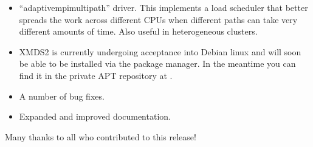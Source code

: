 \documentclass[letterpaper,10pt,english]{sphinxmanual}
\begin{document}
\begin{itemize}
\item {} 
\sphinxAtStartPar
“adaptive\sphinxhyphen{}mpi\sphinxhyphen{}multipath” driver.  This implements a load scheduler that better spreads the work across different CPUs when different paths can take very different amounts of time. Also useful in heterogeneous clusters.

\item {} 
\sphinxAtStartPar
XMDS2 is currently undergoing acceptance into Debian linux and will soon be able to be installed via the package manager. In the meantime you can find it in the private APT repository at .

\item {} 
\sphinxAtStartPar
A number of bug fixes.

\item {} 
\sphinxAtStartPar
Expanded and improved documentation.

\end{itemize}

\sphinxAtStartPar
Many thanks to all who contributed to this release!
\end{document}
